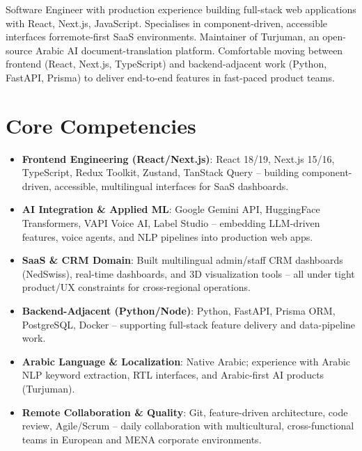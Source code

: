 \documentclass[11pt,a4paper,sans]{moderncv}
\begin{document}
\makecvtitle

\vspace{6pt}
\small{Software Engineer with production experience building full-stack web applications with React, Next.js, JavaScript. Specialises in component-driven, accessible interfaces forremote-first SaaS environments. Maintainer of Turjuman, an open-source Arabic AI document-translation platform. Comfortable moving between frontend (React, Next.js, TypeScript) and backend-adjacent work (Python, FastAPI, Prisma) to deliver end-to-end features in fast-paced product teams.}

\section{Core Competencies}
\vspace{1pt}
\begin{itemize}

\item \textbf{Frontend Engineering (React/Next.js)}: React 18/19, Next.js 15/16, TypeScript, Redux Toolkit, Zustand, TanStack Query -- building component-driven, accessible, multilingual interfaces for SaaS dashboards.

\item \textbf{AI Integration \& Applied ML}: Google Gemini API, HuggingFace Transformers, VAPI Voice AI, Label Studio -- embedding LLM-driven features, voice agents, and NLP pipelines into production web apps.

\item \textbf{SaaS \& CRM Domain}: Built multilingual admin/staff CRM dashboards (NedSwiss), real-time dashboards, and 3D visualization tools -- all under tight product/UX constraints for cross-regional operations.

\item \textbf{Backend-Adjacent (Python/Node)}: Python, FastAPI, Prisma ORM, PostgreSQL, Docker -- supporting full-stack feature delivery and data-pipeline work.

\item \textbf{Arabic Language \& Localization}: Native Arabic; experience with Arabic NLP keyword extraction, RTL interfaces, and Arabic-first AI products (Turjuman).

\item \textbf{Remote Collaboration \& Quality}: Git, feature-driven architecture, code review, Agile/Scrum -- daily collaboration with multicultural, cross-functional teams in European and MENA corporate environments.

\end{itemize}
\end{document}
